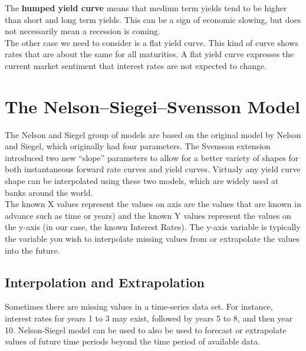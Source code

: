 \documentclass[11pt]{report}
\begin{document}
The \textbf{humped yield curve} means that medium term yields tend to be higher than short and long term yields. This can be a sign of economic slowing, but does not necessarily mean a recession is coming.\\

 The other case we need to consider is a flat yield curve. This kind of curve shows rates that are about the same for all maturities. A flat yield curve expresses the current market sentiment that interest rates are not expected to change.
 

\section{The Nelson--Siegei--Svensson Model}

The Nelson and Siegel group of models are based on the original model by Nelson and Siegel, which originally had four parameters. The Svensson extension introduced two new “slope” parameters to allow for a better variety of shapes for both instantaneous forward rate curves and yield curves.  Virtualy any yield curve shape can be interpolated using these two models, which are widely used at banks around the world.\\

The known X values represent the values on axis are the values that are known in advance such as time or years) and the known Y values represent the values on the y-axis (in our case, the known Interest Rates). The y-axis variable is typically the variable you wish to interpolate missing values from or extrapolate the values into the future.

\subsection{Interpolation and Extrapolation}

Sometimes there are missing values in a time-series data set. For instance, interest rates for years 1 to 3 may exist, followed by years 5 to 8, and then year 10. Nelson-Siegel model can be used to also be used to forecast or extrapolate values of future time periods beyond the time period of available data.
\end{document}
